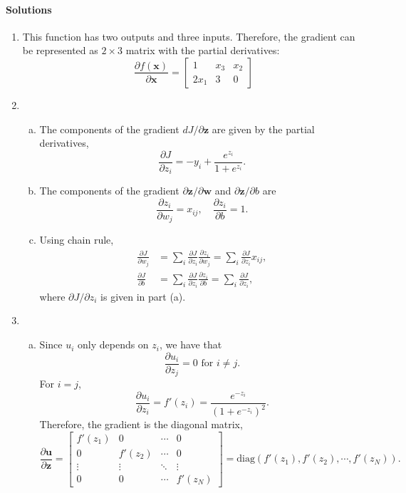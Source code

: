 \documentclass[11pt]{article}
\def\x{\times}
\newcommand{\ubf}{\mathbf{u}}
\newcommand{\wbf}{\mathbf{w}}
\newcommand{\xbf}{\mathbf{x}}
\newcommand{\zbf}{\mathbf{z}}
\begin{document}
\paragraph*{Solutions}
\begin{enumerate}
\item This function has two outputs and three inputs.  Therefore, the gradient can be represented as
$2 \x 3$ matrix with the partial derivatives:
\[
    \frac{\partial f(\xbf)}{\partial \xbf}
    = \left[   \begin{array}{ccc}
    1 & x_3 & x_2 \\
    2x_1 & 3 & 0
    \end{array}
    \right]
\]

\item
\begin{enumerate}[(a)]
\item The components of the gradient $dJ/\partial \zbf$ are given by the partial derivatives,
\[
    \frac{\partial J}{\partial z_i} = -y_i + \frac{e^{z_i}}{1+e^{z_i}}.
\]
\item  The components of the gradient $\partial \zbf/\partial \wbf$ and $\partial \zbf/\partial b$ are
\[
    \frac{\partial z_i}{\partial w_j} = x_{ij}, \quad \frac{\partial z_i}{\partial b} = 1.
\]

\item Using chain rule,
\begin{align*}
    \frac{\partial J}{\partial w_j} &= \sum_i \frac{\partial J}{\partial z_i}\frac{\partial z_i}{\partial w_j} = \sum_i
        \frac{\partial J}{\partial z_i}x_{ij}, \\
    \frac{\partial J}{\partial b} &= \sum_i \frac{\partial J}{\partial z_i}\frac{\partial z_i}{\partial b} =
        \sum_i \frac{\partial J}{\partial z_i},
\end{align*}
where $\partial J/\partial z_i$ is given in part (a).
\end{enumerate}

\item
\begin{enumerate}[(a)]
\item Since $u_i$ only depends on $z_i$, we have that
\[
    \frac{\partial u_i}{\partial z_j} = 0 \mbox{ for } i \neq j.
\]
For $i=j$,
\[
    \frac{\partial u_i}{\partial z_i} = f'(z_i) = \frac{e^{-z_i}}{(1+e^{-z_i})^2}.
\]
Therefore, the gradient is the diagonal matrix,
\[
    \frac{\partial \ubf}{\partial \zbf} = \left[
    \begin{array}{cccc}
    f'(z_1) & 0 & \cdots & 0 \\
    0 & f'(z_2) & \cdots & 0 \\
    \vdots & \vdots & \ddots & \vdots \\
    0 & 0 & \cdots & f'(z_N)
    \end{array} \right]  = \mathrm{diag}(f'(z_1),f'(z_2),\cdots,f'(z_N)).
\]


\end{enumerate}
\end{enumerate}
\end{document}
